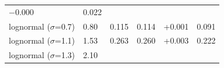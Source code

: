 \begin{longtable}[]{@{}llllll@{}}
\begin{minipage}[t]{0.14\columnwidth}
\ensuremath{-}0.000\strut
\end{minipage} & \begin{minipage}[t]{0.14\columnwidth}\raggedright
0.022\strut
\end{minipage}\tabularnewline
\begin{minipage}[t]{0.14\columnwidth}\raggedright
lognormal (\ensuremath{\sigma}=0.7)\strut
\end{minipage} & \begin{minipage}[t]{0.14\columnwidth}\raggedright
0.80\strut
\end{minipage} & \begin{minipage}[t]{0.14\columnwidth}\raggedright
0.115\strut
\end{minipage} & \begin{minipage}[t]{0.14\columnwidth}\raggedright
0.114\strut
\end{minipage} & \begin{minipage}[t]{0.14\columnwidth}\raggedright
+0.001\strut
\end{minipage} & \begin{minipage}[t]{0.14\columnwidth}\raggedright
0.091\strut
\end{minipage}\tabularnewline
\begin{minipage}[t]{0.14\columnwidth}\raggedright
lognormal (\ensuremath{\sigma}=1.1)\strut
\end{minipage} & \begin{minipage}[t]{0.14\columnwidth}\raggedright
1.53\strut
\end{minipage} & \begin{minipage}[t]{0.14\columnwidth}\raggedright
0.263\strut
\end{minipage} & \begin{minipage}[t]{0.14\columnwidth}\raggedright
0.260\strut
\end{minipage} & \begin{minipage}[t]{0.14\columnwidth}\raggedright
+0.003\strut
\end{minipage} & \begin{minipage}[t]{0.14\columnwidth}\raggedright
0.222\strut
\end{minipage}\tabularnewline
\begin{minipage}[t]{0.14\columnwidth}\raggedright
lognormal (\ensuremath{\sigma}=1.3)\strut
\end{minipage} & \begin{minipage}[t]{0.14\columnwidth}\raggedright
2.10\strut
\end{minipage} & \begin{minipage}[t]{0.14\columnwidth}\raggedright

\end{minipage}
\end{longtable}
